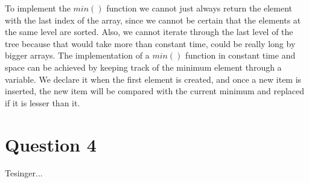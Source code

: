 \documentclass[a4paper]{article}
\begin{document}
\noindent
To implement the $min()$ function we cannot just always return the element with 
the last index of the array, since we cannot be certain that the elements at the 
same level are sorted. Also, we cannot iterate through the last level of the tree 
because that would take more than constant time, could be really long by bigger arrays.  
The implementation of a $min()$ function in constant time and space can be 
achieved by keeping track of the minimum element through a variable. We declare it when 
the first element is created, and once a new item is inserted, the new item will be 
compared with the current minimum and replaced if it is lesser than it.


\section*{Question 4}

\noindent
Tesinger...
\end{document}
